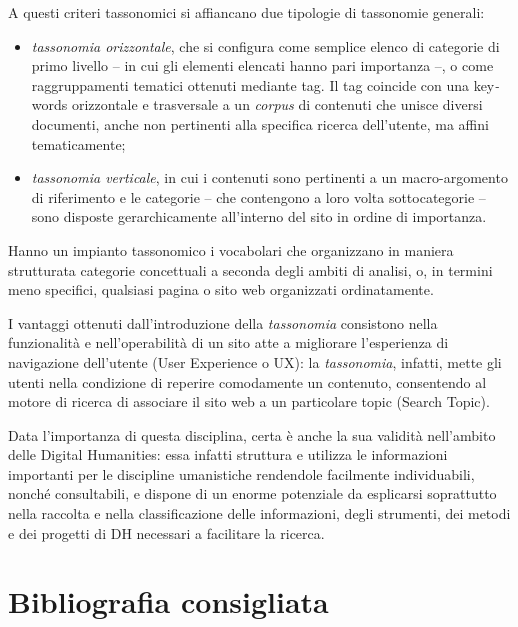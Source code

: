 \documentclass[
  b5paper,
  twoside,
  12pt,
  chapterprefix=false,
  bibliography=totocnumbered,
  parskip=false]{scrbook}
\begin{document}
A questi criteri tassonomici si affiancano due tipologie di tassonomie
generali:

\begin{itemize}
\item
  \emph{tassonomia orizzontale}, che si configura come semplice elenco di
  categorie di primo livello -- in cui gli elementi elencati hanno
  pari importanza --, o come raggruppamenti tematici ottenuti mediante
  tag. Il tag coincide con una key\emph{-}words orizzontale e trasversale a
  un \emph{corpus} di contenuti che unisce diversi documenti, anche non
  pertinenti alla specifica ricerca dell'utente, ma affini
  tematicamente;
\item
  \emph{tassonomia verticale}, in cui i contenuti sono pertinenti a un
  macro-argomento di riferimento e le categorie -- che contengono a
  loro volta sottocategorie -- sono disposte gerarchicamente
  all'interno del sito in ordine di importanza.
\end{itemize}

Hanno un impianto tassonomico i vocabolari che organizzano in maniera
strutturata categorie concettuali a seconda degli ambiti di analisi, o,
in termini meno specifici, qualsiasi pagina o sito web organizzati
ordinatamente.

I vantaggi ottenuti dall'introduzione della \emph{tassonomia} consistono
nella funzionalità e nell'operabilità di un sito atte a migliorare
l'esperienza di navigazione dell'utente (User Experience o UX): la
\emph{tassonomia}, infatti, mette gli utenti nella condizione di reperire
comodamente un contenuto, consentendo al motore di ricerca di associare
il sito web a un particolare topic (Search Topic).

Data l'importanza di questa disciplina, certa è anche la sua validità
nell'ambito delle Digital Humanities: essa infatti struttura e utilizza
le informazioni importanti per le discipline umanistiche rendendole
facilmente individuabili, nonché consultabili, e dispone di un enorme
potenziale da esplicarsi soprattutto nella raccolta e nella
classificazione delle informazioni, degli strumenti, dei metodi e dei
progetti di DH necessari a facilitare la ricerca.

\hypertarget{bibliografia-consigliata-24}{%
\section*{Bibliografia consigliata}\label{bibliografia-consigliata-24}}
\end{document}
